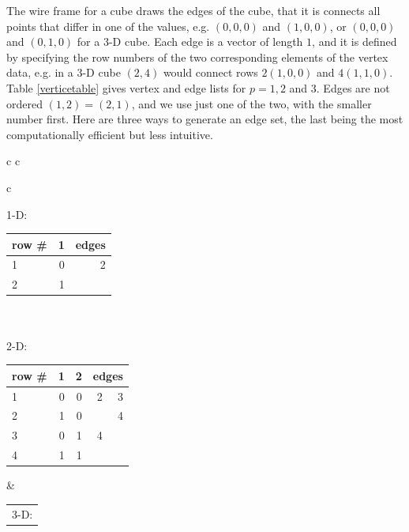 The wire frame for a cube draws the edges of the cube, that it is
connects all points that differ in one of the values, e.g. $(0,0,0)$
and $(1,0,0)$, or $(0,0,0)$ and $(0,1,0)$ for a 3-D cube. Each edge is
a vector of length $1$, and it is defined by specifying the row
numbers of the two corresponding elements of the vertex data, e.g. in
a 3-D cube $(2,4)$ would connect rows $2 (1,0,0)$ and $4
(1,1,0)$. Table \ref{verticetable} gives vertex
and edge lists for $p=1, 2$ and $3$. Edges are not ordered $(1,2)=(2,1)$, and we use just
one of the two, with the smaller number first. Here are three ways to
generate an edge set, the last being the most computationally
efficient but less intuitive. 

\begin{table}[htp]
  \centering
  \begin{tabular}{c c}

    \begin{tabular}{c}

      1-D: \\

      \begin{tabular}{|l ||r|| r|}
        \hline
        row \# & 1 & edges \\
        \hline
        1 & 0 & 2\\
        \hline
        2 & 1 & \\
        \hline
      \end{tabular}
      \\
      \\
      2-D: \\

      \begin{tabular}{|l ||r|r|| r r|}
        \hline
        row \# & 1 & 2 & \multicolumn{2}{c|}{edges} \\
        \hline
        1 & 0 & 0 & 2 & 3\\
        \hline
        2 & 1 & 0 &  & 4 \\
        \hline
        3 & 0 & 1 &  4 & \\
        \hline
        4 & 1 & 1 &  & \\
        \hline
      \end{tabular}
    \end{tabular}

    &

    \begin{tabular}{c}
      3-D: \\


\end{tabular}
\end{tabular}
\end{table}
